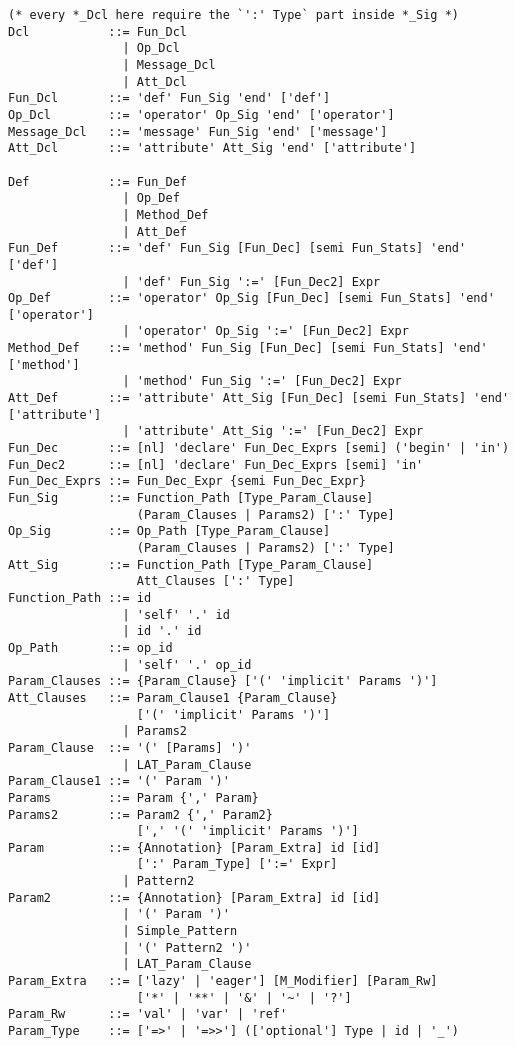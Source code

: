 \syntax\begin{lstlisting}
(* every *_Dcl here require the `':' Type` part inside *_Sig *)
Dcl           ::= Fun_Dcl
                | Op_Dcl
                | Message_Dcl 
                | Att_Dcl
Fun_Dcl       ::= 'def' Fun_Sig 'end' ['def']
Op_Dcl        ::= 'operator' Op_Sig 'end' ['operator']
Message_Dcl   ::= 'message' Fun_Sig 'end' ['message']
Att_Dcl       ::= 'attribute' Att_Sig 'end' ['attribute']

Def           ::= Fun_Def
                | Op_Def
                | Method_Def
                | Att_Def
Fun_Def       ::= 'def' Fun_Sig [Fun_Dec] [semi Fun_Stats] 'end' ['def']
                | 'def' Fun_Sig ':=' [Fun_Dec2] Expr
Op_Def        ::= 'operator' Op_Sig [Fun_Dec] [semi Fun_Stats] 'end' ['operator']
                | 'operator' Op_Sig ':=' [Fun_Dec2] Expr
Method_Def    ::= 'method' Fun_Sig [Fun_Dec] [semi Fun_Stats] 'end' ['method']
                | 'method' Fun_Sig ':=' [Fun_Dec2] Expr
Att_Def       ::= 'attribute' Att_Sig [Fun_Dec] [semi Fun_Stats] 'end' ['attribute']
                | 'attribute' Att_Sig ':=' [Fun_Dec2] Expr
Fun_Dec       ::= [nl] 'declare' Fun_Dec_Exprs [semi] ('begin' | 'in')
Fun_Dec2      ::= [nl] 'declare' Fun_Dec_Exprs [semi] 'in'
Fun_Dec_Exprs ::= Fun_Dec_Expr {semi Fun_Dec_Expr}
Fun_Sig       ::= Function_Path [Type_Param_Clause] 
                  (Param_Clauses | Params2) [':' Type]
Op_Sig        ::= Op_Path [Type_Param_Clause] 
                  (Param_Clauses | Params2) [':' Type]
Att_Sig       ::= Function_Path [Type_Param_Clause] 
                  Att_Clauses [':' Type]
Function_Path ::= id
                | 'self' '.' id
                | id '.' id
Op_Path       ::= op_id
                | 'self' '.' op_id
Param_Clauses ::= {Param_Clause} ['(' 'implicit' Params ')']
Att_Clauses   ::= Param_Clause1 {Param_Clause} 
                  ['(' 'implicit' Params ')']
                | Params2
Param_Clause  ::= '(' [Params] ')'
                | LAT_Param_Clause
Param_Clause1 ::= '(' Param ')'
Params        ::= Param {',' Param}
Params2       ::= Param2 {',' Param2}
                  [',' '(' 'implicit' Params ')']
Param         ::= {Annotation} [Param_Extra] id [id]
                  [':' Param_Type] [':=' Expr]
                | Pattern2
Param2        ::= {Annotation} [Param_Extra] id [id]
                | '(' Param ')'
                | Simple_Pattern
                | '(' Pattern2 ')'
                | LAT_Param_Clause
Param_Extra   ::= ['lazy' | 'eager'] [M_Modifier] [Param_Rw] 
                  ['*' | '**' | '&' | '~' | '?']
Param_Rw      ::= 'val' | 'var' | 'ref'
Param_Type    ::= ['=>' | '=>>'] (['optional'] Type | id | '_')
\end{lstlisting}

